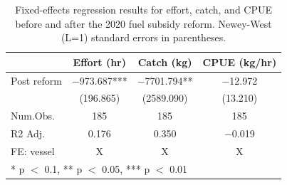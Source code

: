 \begin{table}
\centering
\caption{\label{tab:table}Fixed-effects regression results for effort, catch, and CPUE before and after the 2020 fuel subsidy reform. Newey-West (L=1) standard errors in parentheses.}
\centering
\begin{tabular}[t]{lccc}
\toprule
  & Effort (hr) & Catch (kg) & CPUE (kg/hr)\\
\midrule
Post reform & \num{-973.687}*** & \num{-7701.794}** & \num{-12.972}\\
 & (\num{196.865}) & (\num{2589.090}) & (\num{13.210})\\
\midrule
Num.Obs. & \num{185} & \num{185} & \num{185}\\
R2 Adj. & \num{0.176} & \num{0.350} & \num{-0.019}\\
FE: vessel & X & X & X\\
\bottomrule
\multicolumn{4}{l}{\rule{0pt}{1em}* p $<$ 0.1, ** p $<$ 0.05, *** p $<$ 0.01}\\
\end{tabular}
\end{table}
